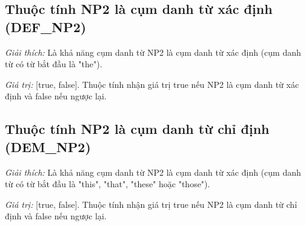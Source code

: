 \documentclass[12pt]{report}
\begin{document}
			\subsection*{Thuộc tính NP2 là cụm danh từ xác định (DEF\_NP2)}
				\par \textit{Giải thích:} Là khả năng cụm danh từ NP2 là cụm danh từ xác định (cụm danh từ có từ bắt đầu là "the"). 
				\par \textit{Giá trị:} [true, false]. Thuộc tính nhận giá trị true nếu NP2 là cụm danh từ xác định và false nếu ngược lại.

			\subsection*{Thuộc tính NP2 là cụm danh từ chỉ định (DEM\_NP2)}
				\par \textit{Giải thích:} Là khả năng cụm danh từ NP2 là cụm danh từ xác định (cụm danh từ có từ bắt đầu là "this", "that", "these" hoặc "those"). 
				\par \textit{Giá trị:} [true, false]. Thuộc tính nhận giá trị true nếu NP2 là cụm danh từ chỉ định và false nếu ngược lại.
\end{document}
